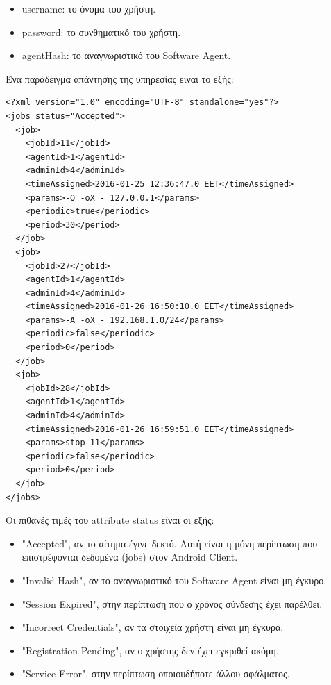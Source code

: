 \documentclass[a4paper,11pt]{article}
\begin{document}
\begin{sloppypar}
\newpage

\begin{itemize}

\item username: το όνομα του χρήστη.
\item password: το συνθηματικό του χρήστη.
\item agentHash: το αναγνωριστικό του Software Agent.

\end{itemize}
Ένα παράδειγμα απάντησης της υπηρεσίας είναι το εξής:
\begin{lstlisting}
<?xml version="1.0" encoding="UTF-8" standalone="yes"?>
<jobs status="Accepted">
  <job>
    <jobId>11</jobId>
    <agentId>1</agentId>
    <adminId>4</adminId>
    <timeAssigned>2016-01-25 12:36:47.0 EET</timeAssigned>
    <params>-O -oX - 127.0.0.1</params>
    <periodic>true</periodic>
    <period>30</period>
  </job>
  <job>
    <jobId>27</jobId>
    <agentId>1</agentId>
    <adminId>4</adminId>
    <timeAssigned>2016-01-26 16:50:10.0 EET</timeAssigned>
    <params>-A -oX - 192.168.1.0/24</params>
    <periodic>false</periodic>
    <period>0</period>
  </job>
  <job>
    <jobId>28</jobId>
    <agentId>1</agentId>
    <adminId>4</adminId>
    <timeAssigned>2016-01-26 16:59:51.0 EET</timeAssigned>
    <params>stop 11</params>
    <periodic>false</periodic>
    <period>0</period>
  </job>
</jobs>
\end{lstlisting}
Οι πιθανές τιμές του attribute status είναι οι εξής:
\begin{itemize}
\item "Accepted", αν το αίτημα έγινε δεκτό. Αυτή είναι η μόνη περίπτωση που επιστρέφονται δεδομένα (jobs) στον Android Client.
\item "Invalid Hash", αν το αναγνωριστικό του Software Agent είναι μη έγκυρο.
\item "Session Expired", στην περίπτωση που ο χρόνος σύνδεσης έχει παρέλθει.
\item "Incorrect Credentials", αν τα στοιχεία χρήστη είναι μη έγκυρα.
\item "Registration Pending", αν ο χρήστης δεν έχει εγκριθεί ακόμη.
\item "Service Error", στην περίπτωση οποιουδήποτε άλλου σφάλματος.
\end{itemize}


\end{sloppypar}
\end{document}
